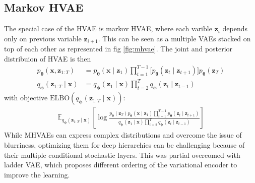 \subsection{Markov HVAE}
The special case of the HVAE is markov HVAE, where each varible $\boldsymbol{z}_i$ depends only on previous variable $\boldsymbol{z}_{i+1}$. This can be
seen as a multiple VAEs stacked on top of each other as represented in fig \ref{fig:mhvae}. The joint and posterior distribuion of HVAE is then
\begin{align*}
    p_{\boldsymbol{\theta}}(\boldsymbol{x},\boldsymbol{z}_{1:T})&=p_{\boldsymbol{\theta}}(\boldsymbol{x}\mid\boldsymbol{z}_1)\prod_{t=1}^{T-1} \bigl[   p_{\boldsymbol{\theta}}(\boldsymbol{z}_{t}\mid\boldsymbol{z}_{t+1}) \bigr]  p_{\boldsymbol{\theta}}(\boldsymbol{z}_{T}) \\
    q_{\boldsymbol{\phi}}(\boldsymbol{z}_{1:T}\mid\boldsymbol{x}) &= q_{\boldsymbol{\phi}}(\boldsymbol{z}_1\mid\boldsymbol{x})\prod_{t=2}^{T}q_{\boldsymbol{\phi}}(\boldsymbol{z}_{t}\mid\boldsymbol{z}_{t-1}) 
\end{align*}
with objective $\mathrm{ELBO}(q_{\boldsymbol{\phi}}(\boldsymbol{z}_{1:T}\mid\boldsymbol{x}))$:
\begin{align*}
    \mathbb{E}_{q_{\boldsymbol{\phi}}(\boldsymbol{z}_{1:T}\mid\boldsymbol{x})}\left[\log \frac{p_{\boldsymbol{\theta}}(\boldsymbol{z}_T)p_{\boldsymbol{\theta}}(\boldsymbol{x}\mid\boldsymbol{z}_1)\prod_{t=1}^{T-1}p_{\boldsymbol{\theta}}(\boldsymbol{z}_{t}\mid\boldsymbol{z}_{t+1})}{q_{\boldsymbol{\phi}}(\boldsymbol{z}_1\mid\boldsymbol{x})\prod_{t=2}^{T}q_{\boldsymbol{\phi}}(\boldsymbol{z}_{t}\mid\boldsymbol{z}_{t-1})}\right]
\end{align*}
While MHVAEs can express complex distributions and overcome the issue of blurriness, optimizing them for deep hierarchies can be challenging because of their multiple conditional stochastic layers.
This was partial overcomed with ladder VAE, which proposes different ordering of the variational encoder to improve the learning. 

